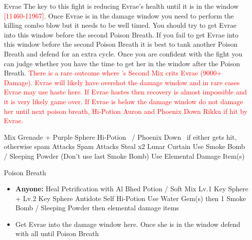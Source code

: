 \begin{battle}[32000]{Evrae}
	The key to this fight is reducing Evrae's health until it is in the window \textcolor{Red}{[11460-11967]}. Once Evrae is in the damage window you need to perform the killing combo blow but it needs to be well timed. You should try to get Evrae into this window before the second Poison Breath. If you fail to get Evrae into this window before the second Poison Breath it is best to tank another Poison Breath and defend for an extra cycle. Once you are confident with the fight you can judge whether you have the time to get her in the window after the Poison Breath.\newline
	\vspace{\baselineskip}
	\textcolor{Red}{There is a rare outcome where \rikku 's Second Mix crits Evrae (9000+ Damage). Evrae will likely have overshot the damage window and in rare cases Evrae may use haste here. If Evrae hastes then recovery is almost impossible and it is very likely game over. If Evrae is below the damage window do not damage her until next poison breath, Hi-Potion Auron and Phoenix Down Rikku if hit by Evrae.}
	\vspace{\baselineskip}
	\begin{itemize}
		\switch{\tidus}{\rikku}
		\rikkuf Mix Grenade + Purple Sphere
		\kimahrif Hi-Potion \auron\ / Phoenix Down \rikku\ if either gets hit, otherwise spam Attacks
		\auronf Spam Attacks
		\rikkuf Steal x2
		\rikkuf Lunar Curtain \auron
		\rikkuf Use Smoke Bomb / Sleeping Powder (Don't use last Smoke Bomb)
		\rikkuf Use Elemental Damage Item(s)
	\end{itemize}
	\vspace{\baselineskip}
	\begin{itemize}
		\enemyf Poison Breath
	\end{itemize}
	\vspace{\baselineskip}
	\begin{itemize}
		\switch{\auron}{\tidus}
		\tidusf Phoenix Down \rikku
		\tidusf Phoenix Down \kimahri
		\item \textbf{Anyone:} Heal Petrification with Al Bhed Potion / Soft
		\rikkuf Mix Lv.1 Key Sphere + Lv.2 Key Sphere
		\switch{\tidus}{\auron}
		\auronf Antidote Self
		\kimahrif Hi-Potion \auron
		\rikkuf Use Water Gem(s) then 1 Smoke Bomb / Sleeping Powder then elemental damage items
		\item Get Evrae into the damage window here. Once she is in the window defend with all until Poison Breath
	\end{itemize}

\end{battle}
